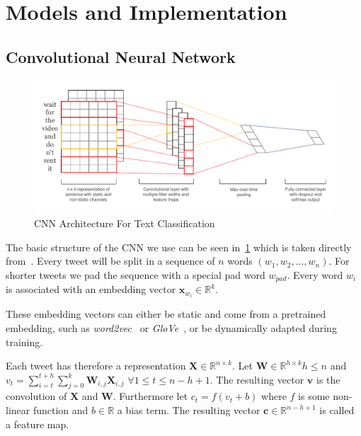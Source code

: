 
\section{Models and Implementation}

\subsection{Convolutional Neural Network}

\begin{figure}
    \centering
    \includegraphics[width=\textwidth]{text_cnn.png}
    \caption{CNN Architecture For Text Classification~\cite{cnn14}}\label{fig:arch}
\end{figure}

The basic structure of the CNN we use can be seen in~\cref{fig:arch} which is
taken directly from~\cite{cnn14}. Every tweet will be split in a sequence of $n$
words $\left(w_1, w_2, \dots, w_n\right)$. For shorter tweets we pad the sequence
with a special pad word $w_{pad}$. Every word $w_i$ is associated with an embedding
vector $\mathbf{x}_{w_i} \in \mathbb{R}^k$.

These embedding vectors can either be static
and come from a pretrained embedding, such as \textit{word2vec}~\cite{word2vec}
or \textit{GloVe}~\cite{glove}, or be dynamically adapted during training.

Each tweet has therefore a representation $\mathbf{X} \in \mathbb{R}^{n \times k}$. Let
$\mathbf{W} \in \mathbb{R}^{h \times k} h \le n$ and
$v_t = \sum_{i = t}^{t + h}\sum_{j = 0}^{k} \mathbf{W}_{i,j} \mathbf{X}_{i,j}$ $\forall 1 \le t \le n - h + 1$.
The resulting vector $\mathbf{v}$ is the convolution of $\mathbf{X}$ and $\mathbf{W}$.
Furthermore let $c_t = f\left(v_t + b\right)$ where $f$ is some non-linear function
and $b \in \mathbb{R}$ a bias term. The resulting vector $\mathbf{c} \in \mathbb{R}^{n - h + 1}$ is called
a feature map.

